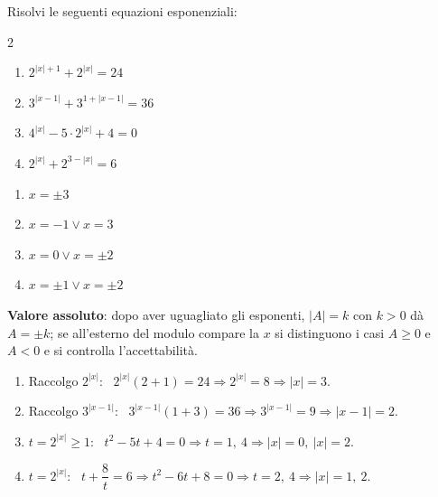 
\begin{question}[ID=4.4, subtitle={Valore assoluto con raccoglimento e incognita ausiliaria}, difficulty=difficile, tags={equazioni, esponenziali, valore assoluto, sostituzione}]
Risolvi le seguenti equazioni esponenziali:
\begin{center}\begin{minipage}{0.92\linewidth}
\begin{multicols}{2}
\begin{enumerate}[leftmargin=3.2cm]
\item $2^{|x|+1} + 2^{|x|} = 24$
\item $3^{|x-1|} + 3^{1+|x-1|} = 36$
\item $4^{|x|} - 5 \cdot 2^{|x|} + 4 = 0$
\item $2^{|x|} + 2^{3-|x|} = 6$
\end{enumerate}
\end{multicols}
\end{minipage}\end{center}
\begin{solution}
\begin{enumerate}
    \item $x=\pm3$
    \item $x=-1\vee x=3$
    \item $x=0\vee x=\pm2$
    \item $x=\pm1\vee x=\pm2$
\end{enumerate}
\end{solution}
\begin{explanation}
\textbf{Valore assoluto}: dopo aver uguagliato gli esponenti, $|A|=k$ con $k>0$ dà $A=\pm k$; se all'esterno del modulo compare la $x$ si distinguono i casi $A\geq0$ e $A<0$ e si controlla l'accettabilità.
\begin{enumerate}
    \item Raccolgo $2^{|x|}$: \ $2^{|x|}(2+1)=24 \Rightarrow 2^{|x|}=8 \Rightarrow |x|=3$.
    \item Raccolgo $3^{|x-1|}$: \ $3^{|x-1|}(1+3)=36 \Rightarrow 3^{|x-1|}=9 \Rightarrow |x-1|=2$.
    \item $t=2^{|x|}\geq1$: \ $t^2-5t+4=0 \Rightarrow t=1,\ 4 \Rightarrow |x|=0,\ |x|=2$.
    \item $t=2^{|x|}$: \ $t+\dfrac8t=6 \Rightarrow t^2-6t+8=0 \Rightarrow t=2,\ 4 \Rightarrow |x|=1,\ 2$.
\end{enumerate}
\end{explanation}
\end{question}


